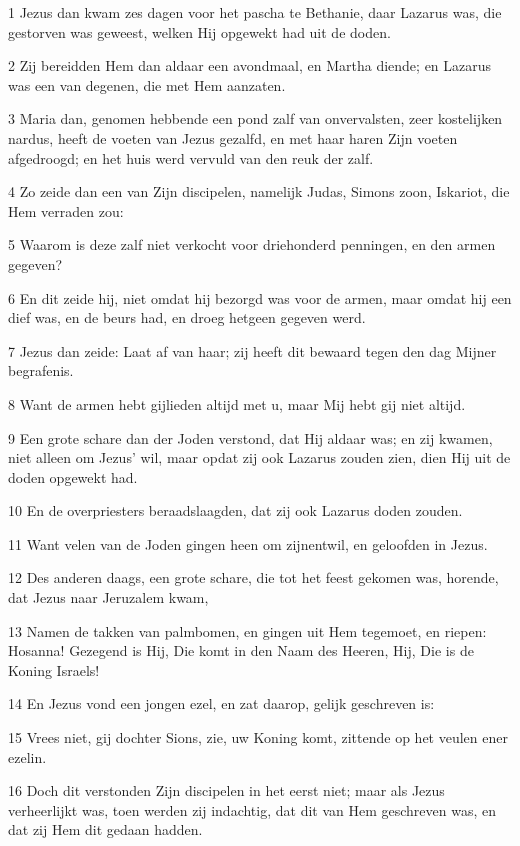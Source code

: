 \par 1 Jezus dan kwam zes dagen voor het pascha te Bethanie, daar Lazarus was, die gestorven was geweest, welken Hij opgewekt had uit de doden.
\par 2 Zij bereidden Hem dan aldaar een avondmaal, en Martha diende; en Lazarus was een van degenen, die met Hem aanzaten.
\par 3 Maria dan, genomen hebbende een pond zalf van onvervalsten, zeer kostelijken nardus, heeft de voeten van Jezus gezalfd, en met haar haren Zijn voeten afgedroogd; en het huis werd vervuld van den reuk der zalf.
\par 4 Zo zeide dan een van Zijn discipelen, namelijk Judas, Simons zoon, Iskariot, die Hem verraden zou:
\par 5 Waarom is deze zalf niet verkocht voor driehonderd penningen, en den armen gegeven?
\par 6 En dit zeide hij, niet omdat hij bezorgd was voor de armen, maar omdat hij een dief was, en de beurs had, en droeg hetgeen gegeven werd.
\par 7 Jezus dan zeide: Laat af van haar; zij heeft dit bewaard tegen den dag Mijner begrafenis.
\par 8 Want de armen hebt gijlieden altijd met u, maar Mij hebt gij niet altijd.
\par 9 Een grote schare dan der Joden verstond, dat Hij aldaar was; en zij kwamen, niet alleen om Jezus' wil, maar opdat zij ook Lazarus zouden zien, dien Hij uit de doden opgewekt had.
\par 10 En de overpriesters beraadslaagden, dat zij ook Lazarus doden zouden.
\par 11 Want velen van de Joden gingen heen om zijnentwil, en geloofden in Jezus.
\par 12 Des anderen daags, een grote schare, die tot het feest gekomen was, horende, dat Jezus naar Jeruzalem kwam,
\par 13 Namen de takken van palmbomen, en gingen uit Hem tegemoet, en riepen: Hosanna! Gezegend is Hij, Die komt in den Naam des Heeren, Hij, Die is de Koning Israels!
\par 14 En Jezus vond een jongen ezel, en zat daarop, gelijk geschreven is:
\par 15 Vrees niet, gij dochter Sions, zie, uw Koning komt, zittende op het veulen ener ezelin.
\par 16 Doch dit verstonden Zijn discipelen in het eerst niet; maar als Jezus verheerlijkt was, toen werden zij indachtig, dat dit van Hem geschreven was, en dat zij Hem dit gedaan hadden.
